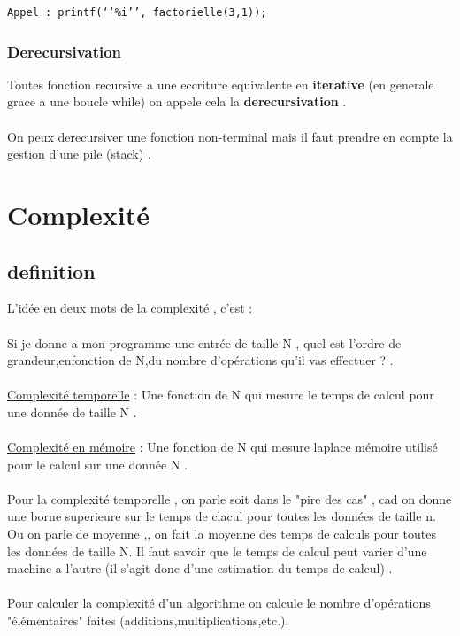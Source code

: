 \documentclass[a4paper,12pt,openany]{book}
\begin{document}
{\begin{verbatim}
Appel : printf(‘‘%i’’, factorielle(3,1));
\end{verbatim}


\subsection{Derecursivation}


Toutes fonction recursive a une eccriture equivalente en \textbf{iterative} (en generale grace a une boucle while) on appele cela la \textbf{derecursivation} .\\
\\
On peux derecursiver une fonction non-terminal mais il faut prendre en compte la gestion d'une pile (stack) .





\chapter{Complexité}

\section{definition}

L'idée en deux mots de la complexité , c'est : \\
\\
Si je donne a mon programme une entrée de taille N , quel est l'ordre de grandeur,enfonction de N,du nombre d'opérations qu'il vas effectuer ? .\\
\\

\underline{Complexité temporelle} : Une fonction de N qui mesure le temps de calcul pour une donnée de taille N .\\
\\
\underline{Complexité en mémoire} : Une fonction de N qui mesure laplace mémoire utilisé pour le calcul sur une donnée N .\\
\\
Pour la complexité temporelle , on parle soit dans le "pire des cas" , cad on donne une borne superieure sur le temps de clacul pour toutes les données de taille n. Ou on parle de moyenne ,, on fait la moyenne des temps de calculs pour toutes les données de taille N. Il faut savoir que le temps de calcul peut varier d'une machine a l'autre (il s'agit donc d'une estimation du temps de calcul) .\\
\\ 
Pour calculer la complexité d'un algorithme on calcule le nombre d'opérations "élémentaires" faites (additions,multiplications,etc.).\\


}
\end{document}
